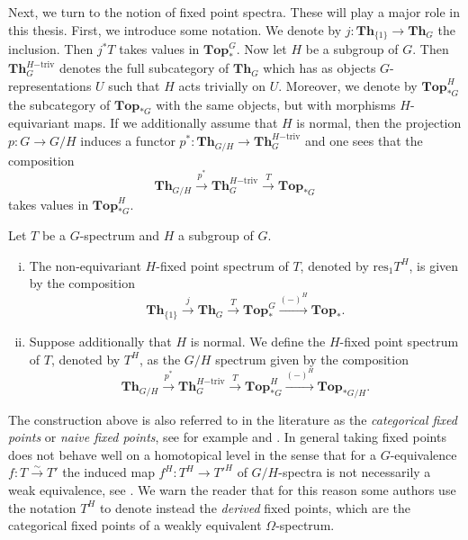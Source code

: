 Next, we turn to the notion of fixed point spectra. These will play a major role in this thesis. 
First, we introduce some notation. We denote by
$j:\mathbf{Th}_{\{1\}}\to \mathbf{Th}_G$ the inclusion.
Then $j^\ast T$ takes values in $\mathbf{Top}_\ast^G $.
Now let $H$ be a subgroup of $G$.
Then $\mathbf{Th}_G^{H\mathrm{-triv}}$ denotes the full
subcategory of $\mathbf{Th}_G$ which has as objects
$G$-representations $U$ such that $H$ acts trivially on $U$.
Moreover, we denote by $\mathbf{Top}_{\ast G}^H$ the subcategory
of $\mathbf{Top}_{\ast G}$ with the same objects, but with morphisms
$H$-equivariant maps. If we additionally assume that $H$ is normal,
then the projection $p:G\to G/H$ induces a functor
$p^\ast:\mathbf{Th}_{G/H}\to\mathbf{Th}_G^{H\mathrm{-triv}}$
and one sees that the composition
\[
\mathbf{Th}_{G/H}\xrightarrow{p^\ast}\mathbf{Th}_G^{H\mathrm{-triv}}
\xrightarrow{T} \mathbf{Top}_{\ast G}
\]
takes values in $\mathbf{Top}_{\ast G}^H$.
\begin{mydef}
Let $T$ be a $G$-spectrum and $H$ a subgroup of $G$.
\begin{enumerate}[(i)]
\item The non-equivariant $H$-fixed point spectrum of $T$, denoted
by $\mathrm{res}_1 T^H$, is given by the composition
\[
\mathbf{Th}_{\{1\}}\xrightarrow{j}\mathbf{Th}_G \xrightarrow{T}
\mathbf{Top}_\ast^G \xrightarrow{(-)^H} \mathbf{Top}_\ast.
\]
\item Suppose additionally that $H$ is normal. We define the $H$-fixed
point spectrum of $T$, denoted by $T^H$, as the $G/H$ spectrum
given by the composition
\[
\mathbf{Th}_{G/H}\xrightarrow{p^\ast}\mathbf{Th}_G^{H\mathrm{-triv}}
\xrightarrow{T} \mathbf{Top}_{\ast G}^H\xrightarrow{(-)^H} \mathbf{Top}_{\ast G/H}.
\]
\end{enumerate}
\end{mydef}
\begin{rem}
The construction above is also referred to in the literature as the
\textit{categorical fixed points} or \textit{naive fixed points}, 
see for example \cite[\pno~82]{mandellmay} and \cite[7.1, \pno~66]{schwedeequivariant}.
In general taking fixed points does not behave well on a homotopical level in the
sense that for a $G$-equivalence $f:T\xrightarrow{\sim}T'$ the induced
map $f^H: T^H\to T'^H$ of $G/H$-spectra is not necessarily
a weak equivalence, see \cite[Warning~3.6, \pno~80]{mandellmay}.
We warn the reader that for this reason some authors use the notation 
$T^H$ to denote instead the \textit{derived} fixed points, which are the categorical
fixed points of a weakly equivalent $\Omega$-spectrum.
\end{rem}


